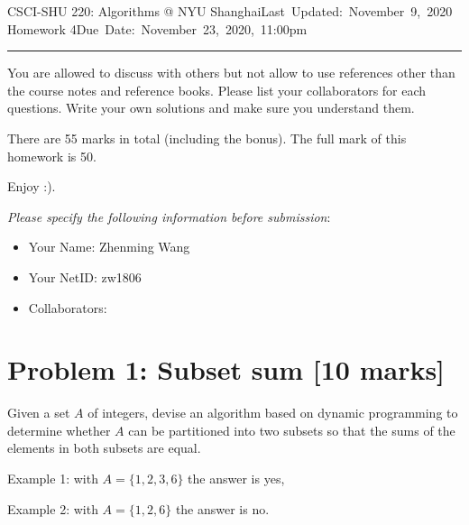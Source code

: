 \documentclass[11pt,twoside]{article}
\makeatletter
\newcommand{\homework}[1]{
   \pagestyle{myheadings}
   \thispagestyle{plain}
   \newpage
   \setcounter{page}{1}
   \noindent
   \classname \hfill \mbox{\updatedday} \\
   \instname \hfill \mbox{\duedate}
   \rule{6.5in}{0.5mm}
   \vspace*{-0.1 in}
}
\newcommand{\problem}[1]{\section*{Problem #1}}
\def\classname{CSCI-SHU 220: Algorithms @ NYU Shanghai}
\def\updatedday{Last Updated: November 9, 2020}
\def\duedate{Due Date: November 23, 2020, 11:00pm}
\def\instname{Homework 4}
\makeatother
\begin{document}
\homework{4}

You are allowed to discuss with others but not allow to use references other than the course notes and reference books. Please list your collaborators for each questions. Write your own solutions and make sure you understand them. 

There are 55 marks in total (including the bonus). The full mark of this homework is 50.  

Enjoy :). 

\textit{Please specify the following information before submission}:
\begin{itemize}
    \item Your Name: Zhenming Wang%
    \item Your NetID: zw1806%
    \item Collaborators: %
\end{itemize}


\problem{1: Subset sum [10 marks]}
 Given a set $A$ of integers, devise an algorithm based on dynamic programming to determine whether $A$ can be partitioned into two subsets so that the sums of the elements in both subsets are equal. 
	
Example 1: with $A=\{1,2,3,6\}$ the answer is yes,
	
Example 2: with $A=\{1,2,6\}$ the answer is no.
\end{document}
